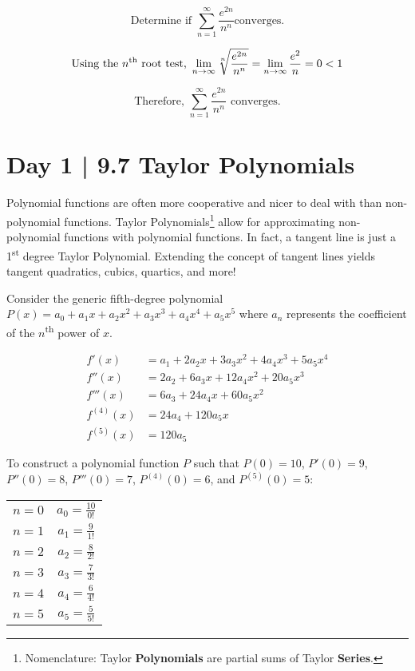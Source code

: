 \documentclass[10pt]{article}
\theoremstyle{definition}
\begin{document}
\[\text{Determine if }\sum_{n=1}^{\infty} \frac{e^{2n}}{n^n}\text{converges.}\]


\[\text{Using the $n$\textsuperscript{th} root test, }\lim_{n \to \infty} \sqrt[n]{\frac{e^{2n}}{n^n}} = \lim_{n \to \infty} \frac{e^2}{n} = 0 < 1\]

\[\text{Therefore, }\sum_{n=1}^{\infty} \frac{e^{2n}}{n^n} \text{ converges.}\]

\newpage

\section{Day 1 | 9.7 Taylor Polynomials}

Polynomial functions are often more cooperative and nicer to deal with than non-polynomial functions. Taylor Polynomials\footnote{Nomenclature: Taylor \textbf{Polynomials} are partial sums of Taylor \textbf{Series}.} allow for approximating non-polynomial functions with polynomial functions. In fact, a tangent line is just a 1\textsuperscript{st} degree Taylor Polynomial. Extending the concept of tangent lines yields tangent quadratics, cubics, quartics, and more!

\vspace{0.5cm}

Consider the generic fifth-degree polynomial $P(x)=a_0 + a_1x + a_2x^2 + a_3x^3 + a_4x^4 + a_5x^5$ where $a_n$ represents the coefficient of the $n$\textsuperscript{th} power of $x$.

\begin{equation*}
\begin{split}
    f'(x)&= a_1 + 2a_2x + 3a_3x^2 + 4a_4x^3 + 5a_5x^4\\
    f''(x)&=2a_2 + 6a_3x + 12a_4x^2 + 20a_5x^3\\
    f'''(x)&=6a_3 + 24a_4x + 60a_5x^2\\
    f^{(4)}(x)&=24a_4 + 120a_5x\\
    f^{(5)}(x)&=120a_5
\end{split}
\end{equation*}

\vspace{0.5cm}
To construct a polynomial function $P$ such that $P(0)=10$, $P'(0)=9$, $P''(0)=8$, $P'''(0)=7$, $P^{(4)}(0)=6$, and $P^{(5)}(0)=5$:

\begin{center}
\begin{tabular}{c c}
$n=0$    &$a_0=\frac{10}{0!}$ \\
$n=1$    &$a_1=\frac{9}{1!}$ \\
$n=2$    &$a_2=\frac{8}{2!}$ \\
$n=3$    &$a_3=\frac{7}{3!}$ \\
$n=4$    &$a_4=\frac{6}{4!}$ \\
$n=5$    &$a_5=\frac{5}{5!}$ \\
\end{tabular}
\end{center}
\end{document}
